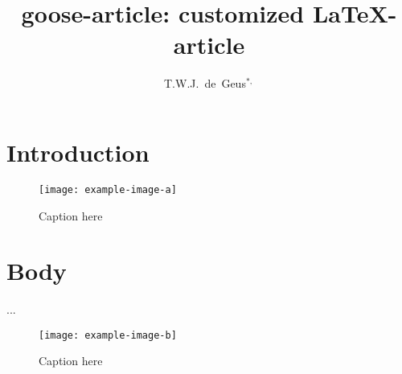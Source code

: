 \documentclass{goose-article}
\title{goose-article: customized \LaTeX-article}
\author[1]{T.W.J.~de~Geus$^{*,}$}
\affil[1]{
  Physics Institute, \'{E}cole Polytechnique F\'{e}d\'{e}rale de Lausanne (EPFL) \nl
  Switzerland
}
\begin{document}
\maketitle

\begin{abstract}
\lipsum[1]
\end{abstract}

\section{Introduction}
\lipsum[2-4] \citep{Geus10,Geus11,Geus12,Geus13,Geus14,Geus15,Geus16,Geus17}

\begin{figure}[htp]
  \centering
  \texttt{[image: example-image-a]}
  \caption{Caption here}
  \label{fig:a}
\end{figure}

\section{Body}
\lipsum[5-10] \citet{Geus10,Geus11,Geus12,Geus13,Geus14,Geus15,Geus16,Geus17} ...

\begin{figure}[htp]
  \centering
  \texttt{[image: example-image-b]}
  \caption{Caption here}
  \label{fig:b}
\end{figure}


\end{document}
